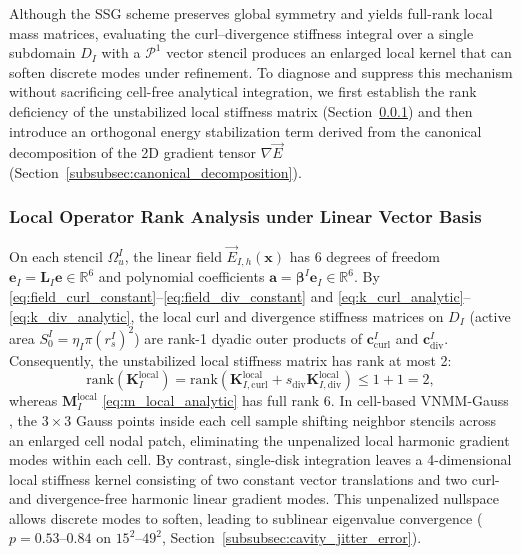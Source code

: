 \documentclass[VANCOUVER]{USG}
\begin{document}
Although the SSG scheme preserves global symmetry and yields full-rank local mass matrices, evaluating the curl--divergence stiffness integral over a single subdomain $D_I$ with a $\mathcal{P}^1$ vector stencil produces an enlarged local kernel that can soften discrete modes under refinement. To diagnose and suppress this mechanism without sacrificing cell-free analytical integration, we first establish the rank deficiency of the unstabilized local stiffness matrix (Section~\ref{subsubsec:local_rank_analysis}) and then introduce an orthogonal energy stabilization term derived from the canonical decomposition of the 2D gradient tensor $\nabla\vec{E}$ (Section~\ref{subsubsec:canonical_decomposition}).

\subsubsection{Local Operator Rank Analysis under Linear Vector Basis}
\label{subsubsec:local_rank_analysis}

On each stencil $\Omega_u^I$, the linear field $\vec{E}_{I,h}(\mathbf{x})$ has 6 degrees of freedom $\mathbf{e}_I = \mathbf{L}_I \mathbf{e} \in \mathbb{R}^6$ and polynomial coefficients $\mathbf{a} = \boldsymbol{\beta}^I \mathbf{e}_I \in \mathbb{R}^6$. By \eqref{eq:field_curl_constant}--\eqref{eq:field_div_constant} and \eqref{eq:k_curl_analytic}--\eqref{eq:k_div_analytic}, the local curl and divergence stiffness matrices on $D_I$ (active area $S_0^I = \eta_I \pi (r_s^I)^2$) are rank-1 dyadic outer products of $\mathbf{c}_{\mathrm{curl}}^I$ and $\mathbf{c}_{\mathrm{div}}^I$. Consequently, the unstabilized local stiffness matrix has rank at most 2:
\begin{equation}
    \mathrm{rank}(\mathbf{K}_I^{\mathrm{local}}) = \mathrm{rank}\left(\mathbf{K}_{I, \mathrm{curl}}^{\mathrm{local}} + s_{\mathrm{div}}\mathbf{K}_{I, \mathrm{div}}^{\mathrm{local}}\right) \le 1 + 1 = 2,
    \label{eq:stiffness_rank_deficiency}
\end{equation}
whereas $\mathbf{M}_I^{\mathrm{local}}$ \eqref{eq:m_local_analytic} has full rank 6. In cell-based VNMM-Gauss \cite{stable_vnmm2d_2026}, the $3 \times 3$ Gauss points inside each cell sample shifting neighbor stencils across an enlarged cell nodal patch, eliminating the unpenalized local harmonic gradient modes within each cell. By contrast, single-disk integration leaves a 4-dimensional local stiffness kernel consisting of two constant vector translations and two curl- and divergence-free harmonic linear gradient modes. This unpenalized nullspace allows discrete modes to soften, leading to sublinear eigenvalue convergence ($p = 0.53\text{--}0.84$ on $15^2\text{--}49^2$, Section~\ref{subsubsec:cavity_jitter_error}).
\end{document}
